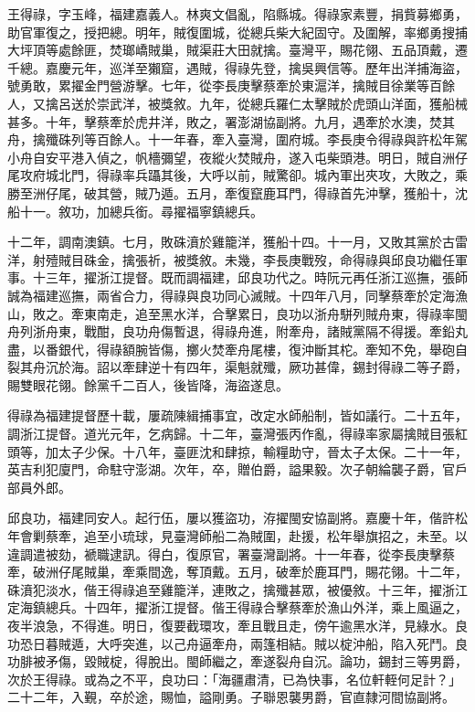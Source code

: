 \begin{pinyinscope}
王得祿，字玉峰，福建嘉義人。林爽文倡亂，陷縣城。得祿家素豐，捐貲募鄉勇，助官軍復之，授把總。明年，賊復圍城，從總兵柴大紀固守。及圍解，率鄉勇搜捕大坪頂等處餘匪，焚瑯嶠賊巢，賊渠莊大田就擒。臺灣平，賜花翎、五品頂戴，遷千總。嘉慶元年，巡洋至獺窟，遇賊，得祿先登，擒吳興信等。歷年出洋捕海盜，號勇敢，累擢金門營游擊。七年，從李長庚擊蔡牽於東滬洋，擒賊目徐業等百餘人，又擒呂送於崇武洋，被獎敘。九年，從總兵羅仁太擊賊於虎頭山洋面，獲船械甚多。十年，擊蔡牽於虎井洋，敗之，署澎湖協副將。九月，遇牽於水澳，焚其舟，擒殲硃列等百餘人。十一年春，牽入臺灣，圍府城。李長庚令得祿與許松年駕小舟自安平港入偵之，帆檣彌望，夜縱火焚賊舟，遂入屯柴頭港。明日，賊自洲仔尾攻府城北門，得祿率兵躡其後，大呼以前，賊驚卻。城內軍出夾攻，大敗之，乘勝至洲仔尾，破其營，賊乃遁。五月，牽復竄鹿耳門，得祿首先沖擊，獲船十，沈船十一。敘功，加總兵銜。尋擢福寧鎮總兵。

十二年，調南澳鎮。七月，敗硃濆於雞籠洋，獲船十四。十一月，又敗其黨於古雷洋，射殪賊目硃金，擒張祈，被獎敘。未幾，李長庚戰歿，命得祿與邱良功繼任軍事。十三年，擢浙江提督。既而調福建，邱良功代之。時阮元再任浙江巡撫，張師誠為福建巡撫，兩省合力，得祿與良功同心滅賊。十四年八月，同擊蔡牽於定海漁山，敗之。牽東南走，追至黑水洋，合擊累日，良功以浙舟駢列賊舟東，得祿率閩舟列浙舟東，戰酣，良功舟傷暫退，得祿舟進，附牽舟，諸賊黨隔不得援。牽鉛丸盡，以番銀代，得祿額腕皆傷，擲火焚牽舟尾樓，復沖斷其柁。牽知不免，舉砲自裂其舟沉於海。詔以牽肆逆十有四年，渠魁就殲，厥功甚偉，錫封得祿二等子爵，賜雙眼花翎。餘黨千二百人，後皆降，海盜遂息。

得祿為福建提督歷十載，屢疏陳緝捕事宜，改定水師船制，皆如議行。二十五年，調浙江提督。道光元年，乞病歸。十二年，臺灣張丙作亂，得祿率家屬擒賊目張紅頭等，加太子少保。十八年，臺匪沈和肆掠，輸糧助守，晉太子太保。二十一年，英吉利犯廈門，命駐守澎湖。次年，卒，贈伯爵，謚果毅。次子朝綸襲子爵，官戶部員外郎。

邱良功，福建同安人。起行伍，屢以獲盜功，洊擢閩安協副將。嘉慶十年，偕許松年會剿蔡牽，追至小琉球，見臺灣師船二為賊圍，赴援，松年舉旗招之，未至。以違調遣被劾，褫職逮訊。得白，復原官，署臺灣副將。十一年春，從李長庚擊蔡牽，破洲仔尾賊巢，牽乘間逸，奪頂戴。五月，破牽於鹿耳門，賜花翎。十二年，硃濆犯淡水，偕王得祿追至雞籠洋，連敗之，擒殲甚眾，被優敘。十三年，擢浙江定海鎮總兵。十四年，擢浙江提督。偕王得祿合擊蔡牽於漁山外洋，乘上風逼之，夜半浪急，不得進。明日，復要截環攻，牽且戰且走，傍午逾黑水洋，見綠水。良功恐日暮賊遁，大呼突進，以己舟逼牽舟，兩篷相結。賊以椗沖船，陷入死鬥。良功腓被矛傷，毀賊椗，得脫出。閩師繼之，牽遂裂舟自沉。論功，錫封三等男爵，次於王得祿。或為之不平，良功曰：「海疆肅清，已為快事，名位軒輊何足計？」二十二年，入覲，卒於途，賜恤，謚剛勇。子聯恩襲男爵，官直隸河間協副將。


\end{pinyinscope}
